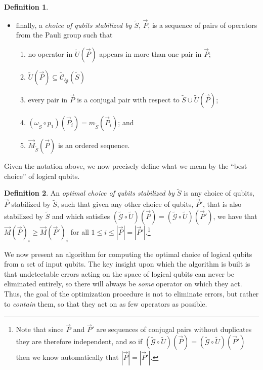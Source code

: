 \documentclass{amsbook}
\theoremstyle{plain}
\theoremstyle{definition}
\newtheorem{definition}{Definition}
\theoremstyle{remark}
\newcommand{\lst}{\vec}
\newcommand{\set}{\tilde}
\newcommand{\genfun}{\tilde{\mathcal{G}}}
\newcommand{\pauligroup}{{\set{\mathfrak{P}}}}
\newcommand{\centralizer}{\set{\mathcal{C}}}
\newcommand{\om}{\omega}
\begin{document}
\begin{definition}
\begin{itemize}
\item finally, a \emph{choice of qubits stabilized by $\set S$}, $\lst P$, is a sequence of pairs of operators from the Pauli group such that 
\begin{enumerate}
\item no operator in $\set U(\lst P)$ appears in more than one pair in $\lst P$;
\item $\set U(\lst P)\subseteq \centralizer_\pauligroup(\set S)$
\item every pair in $\lst P$ is a conjugal pair with respect to $\set S \cup \set U(\lst P)$;
\item $(\om_{\set S}\circ p_1)(\lst P_i)=m_{\set S}(\lst P_i)$; and
\item $\lst M_{\set S}(\lst P)$ is an ordered sequence.
\end{enumerate}
\end{itemize}

\end{definition}
Given the notation above, we now precisely define what we mean by the ``best choice'' of logical qubits.

\begin{definition}
An \emph{optimal choice of qubits stabilized by $\set S$} is any choice of qubits, $\lst P$ stabilized by $\set S$, such that given any other choice of qubits, $\lst P'$, that is also stabilized by $\set S$ and which satisfies $(\genfun\circ \set U)(\lst P)=(\genfun\circ \set U)(\lst P')$, we have that $\lst M(\lst P)_i \ge \lst M(\lst P')_i$ for all $1\le i \le |\lst P|=|\lst P'|$.\footnote{Note that since $\lst P$ and $\lst P'$ are sequences of conjugal pairs without duplicates they are therefore independent, and so if $(\genfun\circ \set U)(\lst P)=(\genfun\circ \set U)(\lst P')$ then we know automatically that $|\lst P|=|\lst P'|$.}
\end{definition}
We now present an algorithm for computing the optimal choice of logical qubits from a set of input qubits.  The key insight upon which the algorithm is built is that undetectable errors acting on the space of logical qubits can never be eliminated entirely, so there will always be \emph{some} operator on which they act.  Thus, the goal of the optimization procedure is not to eliminate errors, but rather to \emph{contain} them, so that they act on as few operators as possible.
\end{document}

